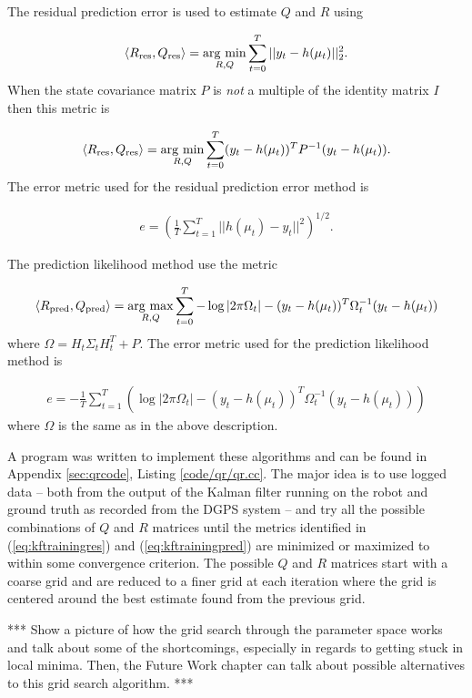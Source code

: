 The residual prediction error is used to estimate $Q$ and $R$ using

\begin{align*}
\left<R_{\text{res}},Q_{\text{res}}\right> = \mathop{\arg\,\min}\limits_{R,Q}\sum_{t=0}^T ||y_t-h(\mu_t)||_2^2.
\end{align*}
When the state covariance matrix $P$ is \textit{not} a multiple of the identity matrix $I$ then this metric is

\begin{align*}
\left<R_{\text{res}},Q_{\text{res}}\right> = \mathop{\arg\,\min}\limits_{R,Q}\sum_{t=0}^T (y_t-h(\mu_t))^TP^{-1}(y_t-h(\mu_t)).
\end{align*}
The error metric used for the residual prediction error method is

\begin{align}
\label{eq:kftrainingres}
e = \left(\frac{1}{T}\sum_{t=1}^T ||h(\mu_t)-y_t||^2\right)^{1/2}.
\end{align}

The prediction likelihood method use the metric

\begin{align*}
\left<R_{\text{pred}},Q_{\text{pred}}\right> = \mathop{\arg\,\max}\limits_{R,Q}\sum_{t=0}^T -\log|2\pi\Omega_t| - (y_t-h(\mu_t))^T\Omega_t^{-1}(y_t-h(\mu_t))
\end{align*}
where $\Omega = H_t\Sigma_tH_t^T+P$. The error metric used for the prediction likelihood method is

\begin{align}
\label{eq:kftrainingpred}
e = -\frac{1}{T}\sum_{t=1}^T \left(\log|2\pi\Omega_t| - (y_t-h(\mu_t))^T\Omega_t^{-1}(y_t-h(\mu_t))\right)
\end{align}
where $\Omega$ is the same as in the above description.

A program was written to implement these algorithms and can be found in Appendix \ref{sec:qrcode}, Listing \ref{code/qr/qr.cc}. The major idea is to use logged data -- both from the output of the Kalman filter running on the robot and ground truth as recorded from the DGPS system -- and try all the possible combinations of $Q$ and $R$ matrices until the metrics identified in (\ref{eq:kftrainingres}) and (\ref{eq:kftrainingpred}) are minimized or maximized to within some convergence criterion. The possible $Q$ and $R$ matrices start with a coarse grid and are reduced to a finer grid at each iteration where the grid is centered around the best estimate found from the previous grid.

*** Show a picture of how the grid search through the parameter space works and talk about some of the shortcomings, especially in regards to getting stuck in local minima. Then, the Future Work chapter can talk about possible alternatives to this grid search algorithm. ***

